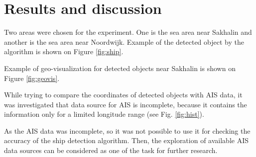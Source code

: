 \section{Results and discussion}

Two areas were chosen for the experiment. One is the sea area near Sakhalin and another is the sea area near Noordwijk. Example of the detected object by the algorithm is shown on Figure \ref{fig:ship}.


Example of geo-visualization for detected objects near Sakhalin is shown on Figure \ref{fig:geovis}.


While trying to compare the coordinates of detected objects with \gls{AIS} data, it was investigated that data source for \gls{AIS} is incomplete, because it contains the information only for a limited longitude range (see Fig. \ref{fig:hist}).


As the \gls{AIS} data was incomplete, so it was not possible to use it for checking the accuracy of the ship detection algorithm. Then, the exploration of available \gls{AIS} data sources can be considered as one of the task for further research.
